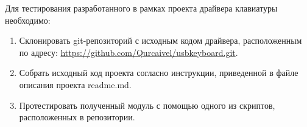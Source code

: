 

Для тестирования разработанного в рамках проекта драйвера клавиатуры необходимо:
\begin{enumerate}
      \item Склонировать git-репозиторий с исходным кодом драйвера,
            расположенным по адресу: \url{https://github.com/Qurcaivel/usbkeyboard.git}.
      \item Собрать исходный код проекта согласно инструкции, приведенной
            в файле описания проекта readme.md.
      \item Протестировать полученный модуль с помощью одного из скриптов,
            расположенных в репозитории.
\end{enumerate}